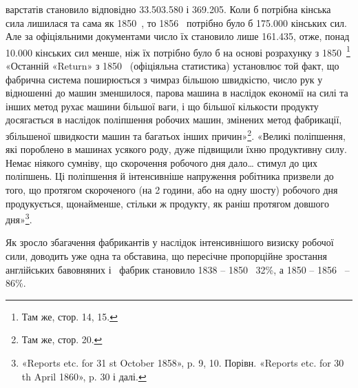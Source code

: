 варстатів становило відповідно \num{33.503.580} і \num{369.205}. Коли б
потрібна кінська сила лишилася та сама як 1850~, то 1856~
потрібно було б \num{175.000} кінських сил. Але за офіціяльними документами
число їх становило лише \num{161.435}, отже, понад \num{10.000}
кінських сил менше, ніж їх потрібно було б на основі розрахунку
з 1850~\footnote{
Там же, стор. 14, 15.
} «Останній «Return» з 1850~ (офіціяльна статистика)
установлює той факт, що фабрична система поширюється з чимраз
більшою швидкістю, число рук у відношенні до машин зменшилося,
парова машина в наслідок економії на силі та інших
метод рухає машини більшої ваги, і що більшої кількости продукту
досягається в наслідок поліпшення робочих машин, змінених
метод фабрикації, збільшеної швидкости машин та багатьох інших
причин»\footnote{
Там же, стор. 20.
}. «Великі поліпшення, які пороблено в машинах
усякого роду, дуже підвищили їхню продуктивну силу. Немає
ніякого сумніву, що скорочення робочого дня дало\dots{} стимул
до цих поліпшень. Ці поліпшення й інтенсивніше напруження
робітника призвели до того, що протягом скороченого (на 2 години,
або на одну шосту) робочого дня продукується, щонайменше,
стільки ж продукту, як раніш протягом довшого дня»\footnote{
«Reports etc. for 31 st October 1858», p. 9, 10. Порівн. «Reports
etc. for 30 th April 1860», p. 30 і далі.
}.

Як зросло збагачення фабрикантів у наслідок інтенсивнішого
визиску робочої сили, доводить уже одна та обставина, що пересічне
пропорційне зростання англійських бавовняних і~
фабрик становило 1838 – 1850~ 32\%, а 1850 – 1856~ – 86\%.


